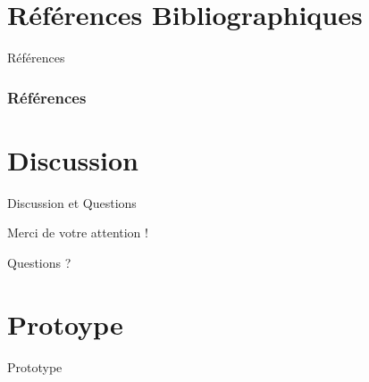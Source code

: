 \documentclass[9pt]{beamer}
\begin{document}
\section{Références Bibliographiques}

\begin{frame}[allowframebreaks]{Références}
  \frametitle{Références}
  \tiny %
  

\end{frame}

\section{Discussion}

\begin{frame}{Discussion et Questions}
  \begin{center}
    \huge Merci de votre attention !
    \vspace{2em}

    Questions ?
  \end{center}
\end{frame}
\section{Protoype}
\begin{frame}
    \titlepage  Prototype
\end{frame}
\end{document}
